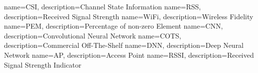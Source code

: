 \makeglossaries

{
    name=CSI,
    description={Channel State Information}
}
{
    name=RSS,
    description={Received Signal Strength}
}
{
    name=WiFi,
    description={Wireless Fidelity}
}
{
    name=PEM,
    description={Percentage of non-zero Element}
}
{
    name=CNN,
    description={Convolutional Neural Network}
}
{
    name=COTS,
    description={Commercial Off-The-Shelf}
}
{
    name=DNN,
    description={Deep Neural Network}
}
{
    name=AP,
    description={Access Point}
}
{
    name=RSSI,
    description={Received Signal Strength Indicator}
}
